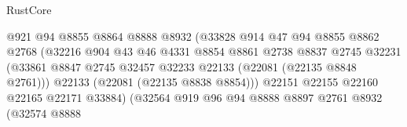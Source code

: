 \begin{lexlean}{RustCore}
\begin{coremodule}
                                            @921
                                            @94
                                            @8855
                                            @8864
                                            @8888
                                            @8932
                                            (@33828
                                              @914
                                              @47
                                              @94
                                              @8855
                                              @8862
                                              @2768
                                              (@32216
                                                @904
                                                @43
                                                @46
                                                @4331
                                                @8854
                                                @8861
                                                @2738
                                                @8837
                                                @2745
                                                @32231
                                                (@33861
                                                  @8847
                                                  @2745
                                                  @32457
                                                  @32233
                                                  @22133
                                                  (@22081 (@22135 @8848 @2761)))
                                                @22133
                                                (@22081 (@22135 @8838 @8854)))
                                              @22151
                                              @22155
                                              @22160
                                              @22165
                                              @22171
                                              @33884)
                                            (@32564
                                              @919
                                              @96
                                              @94
                                              @8888
                                              @8897
                                              @2761
                                              @8932
                                              (@32574
                                                @8888

\end{coremodule}
\end{lexlean}
